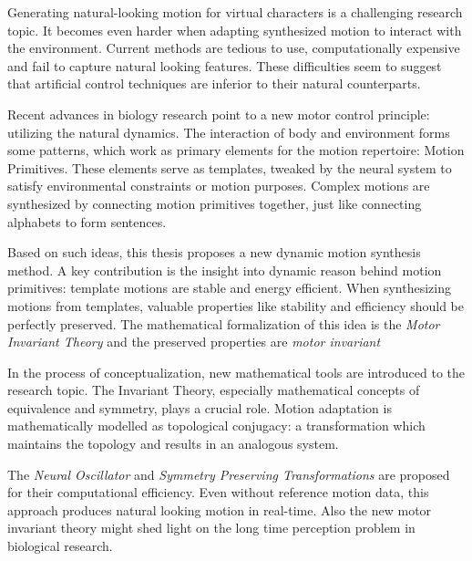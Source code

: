 


\begin{abstracts}        %

Generating natural-looking motion for virtual characters is a challenging research topic.
It becomes even harder when adapting synthesized motion to interact with the environment. 
Current methods are tedious to use, computationally expensive and fail to capture natural looking features.
These difficulties seem to suggest that artificial control techniques are inferior to their natural counterparts.

Recent advances in biology research point to a new motor control principle: utilizing the natural dynamics.
The interaction of body and environment forms some patterns, which work as primary elements for the motion repertoire: Motion Primitives.
These elements serve as templates, tweaked by the neural system to satisfy  environmental constraints or motion purposes.
Complex motions are synthesized by connecting motion primitives together, just like connecting alphabets to form sentences.



Based on such ideas,   this thesis proposes a new dynamic motion synthesis method.
A key contribution is the insight into dynamic reason behind motion primitives: template motions are stable and energy efficient. 
When synthesizing motions from templates, valuable properties  like stability and efficiency should be perfectly preserved.
The mathematical formalization of this idea is the \emph{Motor Invariant Theory} and the preserved properties are \emph{motor invariant}

In the process of conceptualization, new mathematical tools are introduced to the research topic.
The Invariant Theory, especially mathematical concepts of equivalence and symmetry, plays a crucial role.
Motion adaptation is mathematically modelled as topological conjugacy: a transformation which maintains the topology and results in an analogous system.

The \emph{Neural Oscillator} and \emph{Symmetry Preserving Transformations} are proposed for their computational efficiency.
Even without reference motion data, this approach produces natural looking motion in real-time.
Also the new motor invariant theory might  shed light on the long time perception problem in biological research.

\end{abstracts}





